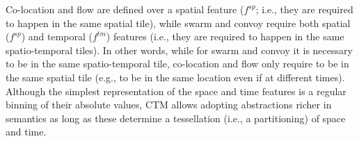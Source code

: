 \documentclass[
]{ceurart}
\begin{document}
Co-location and flow are defined over a spatial feature ($f^{sp}$; i.e., they are required to happen in the same spatial tile), while swarm and convoy require both spatial ($f^{sp}$) and temporal ($f^{tm}$) features (i.e., they are required to happen in the same spatio-temporal tiles).
In other words, while for swarm and convoy it is necessary to be in the same spatio-temporal tile, co-location and flow only require to be in the same spatial tile (e.g., to be in the same location even if at different times).
Although the simplest representation of the space and time features is a regular binning of their absolute values, CTM allows adopting abstractions richer in semantics as long as these determine a tessellation (i.e., a partitioning) of space and time.
\end{document}
